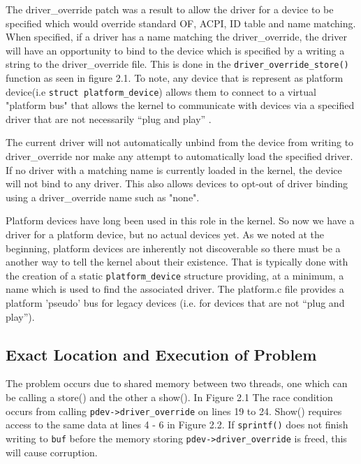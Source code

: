 \documentclass[12pt]{article}
\begin{document}
The driver\_override patch was a result to allow the driver for a device to be specified which would override standard OF, ACPI, ID table and name matching. When specified, if a driver has a name matching the driver\_override, the driver will have an opportunity to bind to the device which is specified by a writing a string to the driver\_override file. This is done in the \texttt{driver\_override\_store()} function as seen in figure 2.1. To note, any device that is represent as platform device(i.e \texttt{struct platform\_device}) allows them to connect to a virtual "platform bus" that allows the kernel to communicate with devices via a specified driver that are not necessarily ``plug and play'' \cite{sourcecode}.


The current driver will not automatically unbind from the device from writing to driver\_override nor make any attempt to automatically load the specified driver.  If no driver with a matching name is currently loaded in the kernel, the device will not bind to any driver.  This also allows devices to opt-out of driver binding using a driver\_override name such as "none".

Platform devices have long been used in this role in the kernel. 
So now we have a driver for a platform device, but no actual devices yet. As we noted at the beginning, platform devices are inherently not discoverable so there must be a another way to tell the kernel about their existence. That is typically done with the creation of a static \texttt{platform\_device} structure providing, at a minimum, a name which is used to find the associated driver. The platform.c file provides a platform 'pseudo' bus for legacy devices\cite{sourcecode} (i.e. for devices that are not ``plug and play'').
%


\subsection{Exact Location and Execution of Problem}
The problem occurs due to shared memory between two threads, one which can be calling a store() and the other a show(). In Figure 2.1 The race condition occurs from calling \texttt{pdev->driver\_override} on lines 19 to 24. Show() requires access to the same data at lines 4 - 6 in Figure 2.2. If \texttt{sprintf()} does not finish writing to \texttt{buf} before the memory storing \texttt{pdev->driver\_override} is freed, this will cause corruption.
\end{document}
